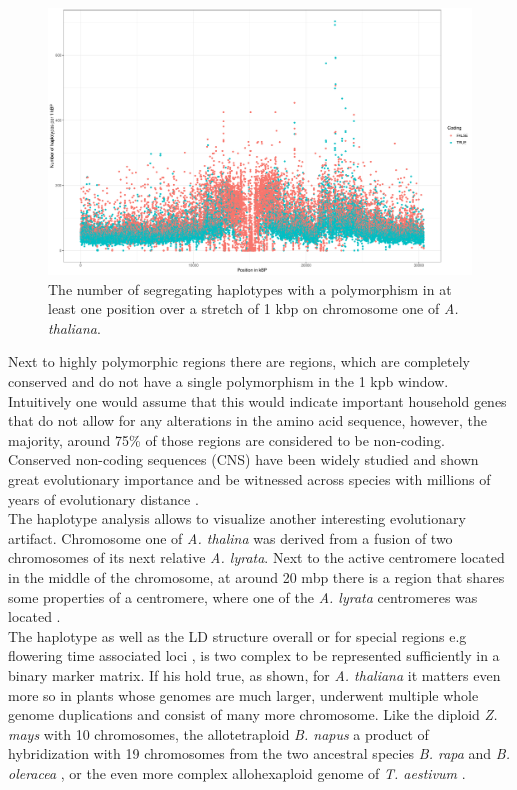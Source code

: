 \begin{figure}[H]
\centering 
\includegraphics[height=.55\textheight, width=1.1\textwidth]{Figures/chr1_hap}
\decoRule
\caption[Haplotype strutcture of chromosome 1 of \textit{A. thaliana}]{The number of segregating haplotypes with a polymorphism in at least one position over a stretch of 1 kbp on chromosome one of \textit{A. thaliana}.}
\label{fig:chr1}
\end{figure}

Next to highly polymorphic regions there are regions, which are completely conserved and
do not have a single polymorphism in the 1 kpb window. Intuitively one would assume that
this would indicate important household genes that do not allow for any alterations in the
amino acid sequence, however, the majority, around 75\% of those regions are considered to
be non-coding. Conserved non-coding sequences (CNS) have been widely studied and shown
great evolutionary importance and be witnessed across species with millions of years of
evolutionary distance \cite{Burgess946}. \\
The haplotype analysis allows to visualize another interesting evolutionary
artifact. Chromosome one of \textit{A. thalina} was derived from a fusion of two
chromosomes of its next relative \textit{A. lyrata}. Next to the active centromere located
in the middle of the chromosome, at around 20 mbp there is a region that shares some
properties of a centromere, where one of the \textit{A. lyrata} centromeres was
located \cite{koch2007evolution}. \\
The haplotype as well as the LD structure overall or for special regions e.g flowering
time associated loci \cite{li2014multiple}, is two complex to be represented sufficiently
in a binary marker matrix. If his hold true, as shown, for \textit{A. thaliana} it matters
even more so in plants whose genomes are much larger, underwent multiple whole genome
duplications and consist of many more chromosome. Like the diploid \textit{Z. mays} with
10 chromosomes, the allotetraploid \textit{B. napus} a product of hybridization with 19
chromosomes from the two ancestral species \textit{B. rapa} and \textit{B. oleracea}
\cite{liu2018brassica}, or the even more complex allohexaploid genome of
\textit{T. aestivum} \cite{international2018shifting}.

